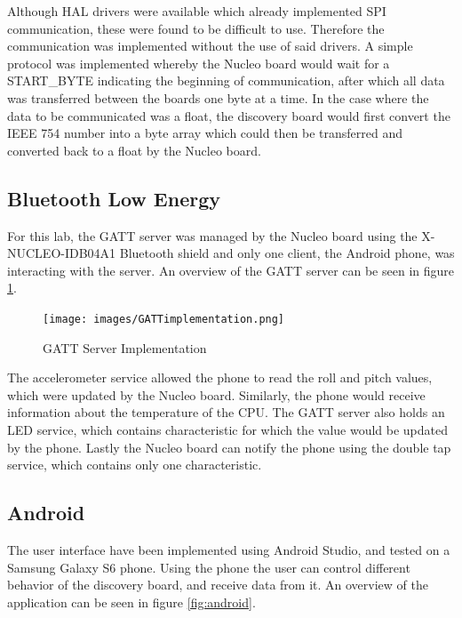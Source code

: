 \documentclass[12pt]{article}
\begin{document}
Although HAL drivers were available which already implemented SPI communication, these were found to be difficult to use. Therefore the communication was implemented without the use of said drivers. A simple protocol was implemented whereby the Nucleo board would wait for a START\_BYTE indicating the beginning of communication, after which all data was transferred between the boards one byte at a time. In the case where the data to be communicated was a float, the discovery board would first convert the IEEE 754 number into a byte array which could then be transferred and converted back to a float by the Nucleo board.

\subsection{Bluetooth Low Energy}
For this lab, the GATT server was managed by the Nucleo board using the X-NUCLEO-IDB04A1 Bluetooth shield and only one client, the Android phone, was interacting with the server. An overview of the GATT server can be seen in figure \ref{fig:gattimp}.

\begin{figure}[!htb]
 \centering
 \texttt{[image: images/GATTimplementation.png]}
 \caption{GATT Server Implementation}
 \label{fig:gattimp}
\end{figure}

The accelerometer service allowed the phone to read the roll and pitch values, which were updated by the Nucleo board. Similarly, the phone would receive information about the temperature of the CPU. The GATT server also holds an LED service, which contains characteristic for which the value would be updated by the phone. Lastly the Nucleo board can notify the phone using the double tap service, which contains only one characteristic.

\subsection{Android}
The user interface have been implemented using Android Studio, and tested on a Samsung Galaxy S6 phone. Using the phone the user can control different behavior of the discovery board, and receive data from it. An overview of the application can be seen in figure \ref{fig:android}.
\end{document}
